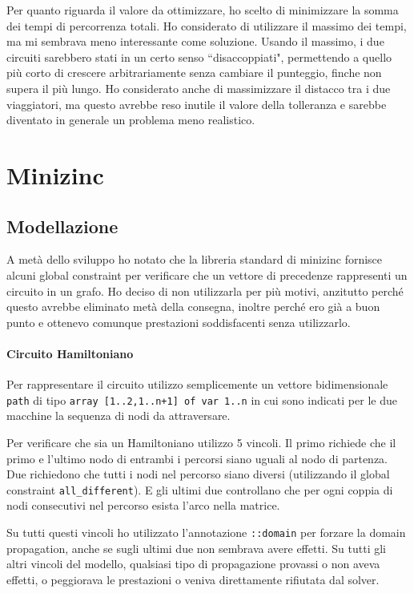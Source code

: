 \documentclass[11pt, a4paper]{article}
\begin{document}
Per quanto riguarda il valore da ottimizzare, ho scelto di minimizzare la somma dei tempi di percorrenza totali.
Ho considerato di utilizzare il massimo dei tempi, ma mi sembrava meno interessante come soluzione. Usando il massimo, i due circuiti sarebbero stati in un certo senso ``disaccoppiati", permettendo a quello più corto di crescere arbitrariamente senza cambiare il punteggio, finche non supera il più lungo.
Ho considerato anche di massimizzare il distacco tra i due viaggiatori, ma questo avrebbe reso inutile il valore della tolleranza e sarebbe diventato in generale un problema meno realistico.

\section{Minizinc}

\subsection{Modellazione}

A metà dello sviluppo ho notato che la libreria standard di minizinc fornisce alcuni global constraint per verificare che un vettore di precedenze rappresenti un circuito in un grafo. Ho deciso di non utilizzarla per più motivi, anzitutto perché questo avrebbe eliminato metà della consegna, inoltre perché ero già a buon punto e ottenevo comunque prestazioni soddisfacenti senza utilizzarlo.

\paragraph{Circuito Hamiltoniano}
Per rappresentare il circuito utilizzo semplicemente un vettore bidimensionale \lstinline{path} di tipo \lstinline{array [1..2,1..n+1] of var 1..n} in cui sono indicati per le due macchine la sequenza di nodi da attraversare.

Per verificare che sia un Hamiltoniano utilizzo 5 vincoli. Il primo richiede che il primo e l'ultimo nodo di entrambi i percorsi siano uguali al nodo di partenza.
Due richiedono che tutti i nodi nel percorso siano diversi (utilizzando il global constraint \lstinline{all_different}). E gli ultimi due controllano che per ogni coppia di nodi consecutivi nel percorso esista l'arco nella matrice.

Su tutti questi vincoli ho utilizzato l'annotazione \lstinline{::domain} per forzare la domain propagation, anche se sugli ultimi due non sembrava avere effetti. Su tutti gli altri vincoli del modello, qualsiasi tipo di propagazione provassi o non aveva effetti, o peggiorava le prestazioni o veniva direttamente rifiutata dal solver.
\end{document}
